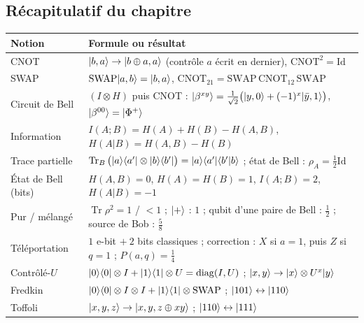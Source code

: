 \subsection{Récapitulatif du chapitre}

\begin{center}
\renewcommand{\arraystretch}{1.5}
\begin{tabular}{@{}lp{12cm}@{}}
\toprule
\textbf{Notion} & \textbf{Formule ou résultat} \\
\midrule
CNOT & $|b,a\rangle\to|b\oplus a,a\rangle$ (contrôle $a$ écrit en dernier), $\mathrm{CNOT}^2=\mathrm{Id}$ \\
SWAP & $\mathrm{SWAP}|a,b\rangle=|b,a\rangle$, \quad $\mathrm{CNOT}_{21}=\mathrm{SWAP}\,\mathrm{CNOT}_{12}\,\mathrm{SWAP}$ \\
Circuit de Bell & $(I\otimes H)$ puis CNOT : $|\beta^{xy}\rangle=\frac{1}{\sqrt2}\big(|y,0\rangle+(-1)^x|\bar y,1\rangle\big)$, $|\beta^{00}\rangle=|\Phi^+\rangle$ \\
Information & $I(A;B)=H(A)+H(B)-H(A,B)$, \quad $H(A|B)=H(A,B)-H(B)$ \\
Trace partielle & $\operatorname{Tr}_B\big(|a\rangle\langle a'|\otimes|b\rangle\langle b'|\big)=|a\rangle\langle a'|\langle b'|b\rangle$ ; état de Bell : $\rho_A=\frac12\mathrm{Id}$ \\
État de Bell (bits) & $H(A,B)=0$, \quad $H(A)=H(B)=1$, \quad $I(A;B)=2$, \quad $H(A|B)=-1$ \\
Pur / mélangé & $\operatorname{Tr}\rho^2=1$ / $<1$ ; $|+\rangle$ : $1$ ; qubit d'une paire de Bell : $\frac12$ ; source de Bob : $\frac58$ \\
Téléportation & $1$ e-bit $+\ 2$ bits classiques ; correction : $X$ si $a=1$, puis $Z$ si $q=1$ ; $P(a,q)=\frac14$ \\
Contrôlé-$U$ & $|0\rangle\langle 0|\otimes I+|1\rangle\langle 1|\otimes U=\mathrm{diag}(I,U)$ ; $|x,y\rangle\to|x\rangle\otimes U^x|y\rangle$ \\
Fredkin & $|0\rangle\langle 0|\otimes I\otimes I+|1\rangle\langle 1|\otimes\mathrm{SWAP}$ ; $|101\rangle\leftrightarrow|110\rangle$ \\
Toffoli & $|x,y,z\rangle\to|x,y,z\oplus xy\rangle$ ; $|110\rangle\leftrightarrow|111\rangle$ \\
\bottomrule
\end{tabular}
\end{center}

